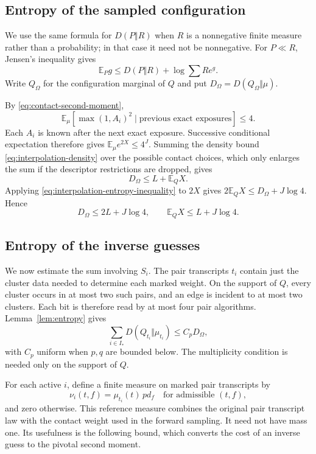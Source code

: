 \documentclass[11pt]{article}
\theoremstyle{definition}
\begin{document}
\subsection{Entropy of the sampled configuration}

We use the same formula for $D(P\Vert R)$ when $R$ is a nonnegative finite
measure rather than a probability; in that case it need not be
nonnegative. For $P\ll R$, Jensen's inequality gives
\begin{equation}\label{eq:interpolation-entropy-inequality}
 \mathbb E_P g\le D(P\Vert R)+\log\sum R e^g.
\end{equation}
Write $Q_\Omega$ for the configuration marginal of $Q$ and put
$D_\Omega=D(Q_\Omega\Vert\mu)$.

By \eqref{eq:contact-second-moment},
\[
 \mathbb E_\mu[\max(1,A_i)^2\mid\text{previous exact exposures}]\le4.
\]
Each $A_i$ is known after the next exact exposure. Successive conditional
expectation therefore gives
$\mathbb E_\mu e^{2X}\le4^J$. Summing the density bound
\eqref{eq:interpolation-density} over the possible contact choices,
which only enlarges the sum if the descriptor restrictions are dropped,
gives
\[
 D_\Omega\le L+\mathbb E_Q X.
\]
Applying \eqref{eq:interpolation-entropy-inequality} to $2X$ gives
$2\mathbb E_Q X\le D_\Omega+J\log4$. Hence
\begin{equation}\label{eq:interpolation-configuration-entropy}
 D_\Omega\le2L+J\log4,
 \qquad \mathbb E_Q X\le L+J\log4.
\end{equation}

\subsection{Entropy of the inverse guesses}

We now estimate the sum involving $S_i$. The pair transcripts $t_i$
contain just the cluster data needed to determine each marked weight.
On the support of $Q$, every cluster occurs in at most two such pairs,
and an edge is incident to at most two clusters. Each bit is therefore
read by at most four pair algorithms. Lemma~\ref{lem:entropy} gives
\begin{equation}\label{eq:interpolation-pair-entropy}
 \sum_{i\in I_*}D(Q_{t_i}\Vert\mu_{t_i})\le C_pD_\Omega,
\end{equation}
with $C_p$ uniform when $p,q$ are bounded below. The multiplicity
condition is needed only on the support of $Q$.

For each active $i$, define a finite measure on marked pair transcripts by
\[
 \nu_i(t,f)=\mu_{t_i}(t)\,pd_f
 \quad\text{for admissible }(t,f),
\]
and zero otherwise. This reference measure combines the original pair
transcript law with the contact weight used in the forward sampling.
It need not have mass one. Its usefulness is the following bound, which
converts the cost of an inverse guess to the pivotal second moment.
\end{document}

